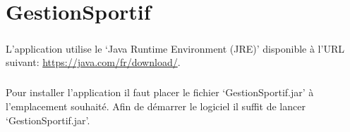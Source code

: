 \documentclass[french,12pt,a4paper,openany]{book}
\begin{document}
\chapter{GestionSportif}
\paragraph{}{L'application utilise le `Java Runtime Environment (JRE)' disponible à l'URL suivant:  \url{https://java.com/fr/download/}.}
\paragraph{}{Pour installer l'application il faut placer le fichier `GestionSportif.jar' à l'emplacement souhaité. Afin de démarrer le logiciel il suffit de lancer `GestionSportif.jar'.}
\end{document}
